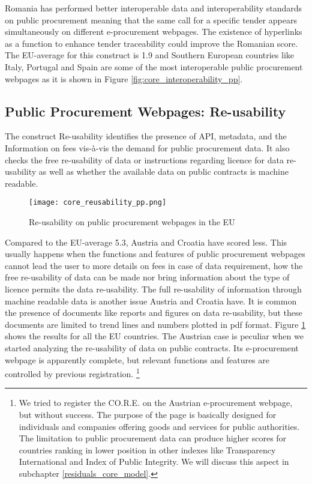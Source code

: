\documentclass[a4paper, twoside]{report}
\let\oldfootnote\footnote
\renewcommand\footnote[1]{%
\oldfootnote{\hspace{2mm}#1}}
\begin{document}
Romania has performed better interoperable data and interoperability standards on public procurement meaning that the same call for a specific tender appears simultaneously on different e-procurement webpages. The existence of hyperlinks as a function to enhance tender traceability could improve the Romanian score. The EU-average for this construct is 1.9 and Southern European countries like Italy, Portugal and Spain are some of the most interoperable public procurement webpages as it is shown in Figure \ref{fig:core_interoperability_pp}.\\  


\subsection{Public Procurement Webpages: Re-usability}

The construct Re-usability identifies the presence of API, metadata, and the Information on fees vis-à-vis the demand for public procurement data. It also checks the free re-usability of data or instructions regarding licence for data re-usability as well as whether the available data on public contracts is machine readable.\\
\begin{figure}[H]
\centering
	\caption{Re-usability on public procurement webpages in the EU}
	\texttt{[image: core\_reusability\_pp.png]}
	\label{fig:core_reusability_pp}
\end{figure}

Compared to the EU-average 5.3, Austria and Croatia have scored less. This usually happens when the functions and features of public procurement webpages cannot lead the user to more details on fees in case of data requirement, how the free re-usability of data can be made nor bring information about the type of licence permits the data re-usability. The full re-usability of information through machine readable data is another issue Austria and Croatia have. It is common the presence of documents like reports and figures on data re-usability, but these documents are limited to trend lines and numbers plotted in pdf format. Figure \ref{fig:core_reusability_pp} shows the results for all the EU countries. The Austrian case is peculiar when we started analyzing the re-usability of data on public contracts. Its e-procurement webpage is apparently complete, but relevant functions and features are controlled by previous registration.\footnote{We tried to register the CO.R.E. on the Austrian e-procurement webpage, but without success. The purpose of the page is basically designed for individuals and companies offering goods and services for public authorities. The limitation to public procurement data can produce higher scores for countries ranking in lower position in other indexes like Transparency International and Index of Public Integrity. We will discuss this aspect in subchapter \ref{residuals_core_model}.}\\ 
\end{document}
